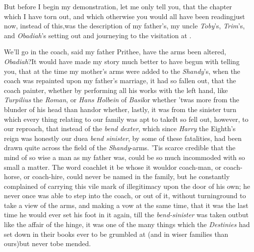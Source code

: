 \documentclass{article}
\begin{document}
But before I begin my demonstration, let me only tell you,
that the chapter which I have torn out, and which otherwise
you would all have been reading\break just now, instead of
this,\tsk was the description of my father’s, my uncle
\textit{Toby}’s, \textit{Trim}’s, and \textit{Obadiah}’s
setting out and journeying to the visitation at
\lower-4pt\hbox{\astiv}.

We’ll go in the coach, said my father\break
\tsk Prithee, have the arms been altered,
\textit{Obadiah}?\tsk It would have made my story much
better to have begun with telling you, that at the time my
mother’s arms were added to the \textit{Shandy}’s, when the
coach was repainted upon my father’s marriage, it had so
fallen out, that the coach painter, whether by performing all
his works with the left hand, like\break
\textit{Turpilius} the
\textit{Roman}, or \textit{Hans Holbein} of
\textit{Basil}\tsk or whether ’twas more from the blunder of
his head than hand\tsk or whe\-ther, lastly, it was from the
sinister turn which every thing relating to our family was
apt to take\tsk It so fell out, however, to our reproach,
that instead of the \textit{bend dexter}, which since
\textit{Harry} the Eighth’s reign was honestly our due\tsk a
\textit{bend sinister}, by some of these fatalities, had
been drawn quite across the field of the \textit{Shandy}-arms. 
’Tis scarce credible that the mind of so wise a man as
my father was, could be so much incommoded with so small a
matter. The word coach\tsk let it be whose it would\tsk or
coach-man, or coach-horse, or coach-hire, could never be
named in the family, but he constantly complained of
carrying this vile mark of illegitimacy upon the door of his
own; he never once was able to step into the coach, or out
of it, without turning\break round to take a view of the arms, and
making a vow at the same time, that it was the last time he
would ever set his foot in it again, till the
\textit{bend-sinister} was taken out\tsk but like the affair
of the hinge, it was one of the many things which the
\textit{Destinies} had set down in their books ever to be
grumbled at (and in wiser families than ours)\tsk but never
to\break be mended.
\end{document}
